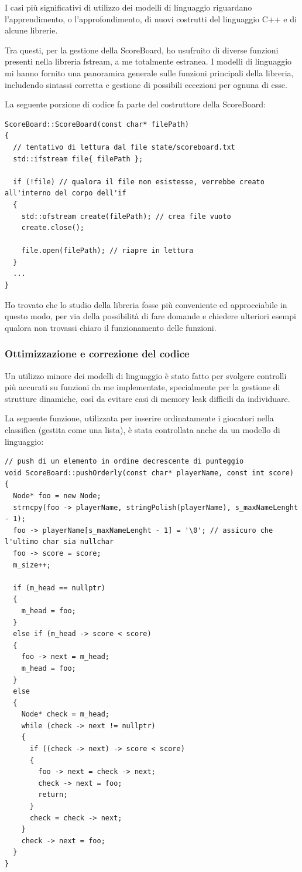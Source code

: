 \documentclass[a4paper,11pt]{article}
\begin{document}
I casi più significativi di utilizzo dei modelli di linguaggio riguardano l'apprendimento, o l'approfondimento, di nuovi costrutti del linguaggio C++ e di alcune librerie.

Tra questi, per la gestione della ScoreBoard, ho usufruito di diverse funzioni presenti nella libreria fstream, a me totalmente estranea.
I modelli di linguaggio mi hanno fornito una panoramica generale sulle funzioni principali della libreria, includendo sintassi corretta e gestione di possibili eccezioni per ognuna di esse.

La seguente porzione di codice fa parte del costruttore della ScoreBoard:
\begin{verbatim}
ScoreBoard::ScoreBoard(const char* filePath)
{
  // tentativo di lettura dal file state/scoreboard.txt
  std::ifstream file{ filePath };

  if (!file) // qualora il file non esistesse, verrebbe creato all'interno del corpo dell'if
  {
    std::ofstream create(filePath); // crea file vuoto
    create.close();

    file.open(filePath); // riapre in lettura
  }
  ...
}
\end{verbatim}

Ho trovato che lo studio della libreria fosse più conveniente ed approcciabile in questo modo, per via della possibilità di fare domande e chiedere ulteriori esempi qualora non trovassi chiaro il funzionamento delle funzioni.
\subsubsection{Ottimizzazione e correzione del codice}

Un utilizzo minore dei modelli di linguaggio è stato fatto per svolgere controlli più accurati su funzioni da me implementate, specialmente per la gestione di strutture dinamiche, così da evitare casi di memory leak difficili da individuare.

La seguente funzione, utilizzata per inserire ordinatamente i giocatori nella classifica (gestita come una lista), è stata controllata anche da un modello di linguaggio:
\begin{verbatim}
// push di un elemento in ordine decrescente di punteggio
void ScoreBoard::pushOrderly(const char* playerName, const int score) 
{
  Node* foo = new Node;
  strncpy(foo -> playerName, stringPolish(playerName), s_maxNameLenght - 1);
  foo -> playerName[s_maxNameLenght - 1] = '\0'; // assicuro che l'ultimo char sia nullchar
  foo -> score = score;
  m_size++;
  
  if (m_head == nullptr)
  {  
    m_head = foo;
  }
  else if (m_head -> score < score)
  {
    foo -> next = m_head;
    m_head = foo;
  }
  else
  {
    Node* check = m_head;
    while (check -> next != nullptr)
    {
      if ((check -> next) -> score < score)
      {
        foo -> next = check -> next;
        check -> next = foo;
        return;
      }
      check = check -> next;
    }
    check -> next = foo;
  }
}
\end{verbatim}
\end{document}
